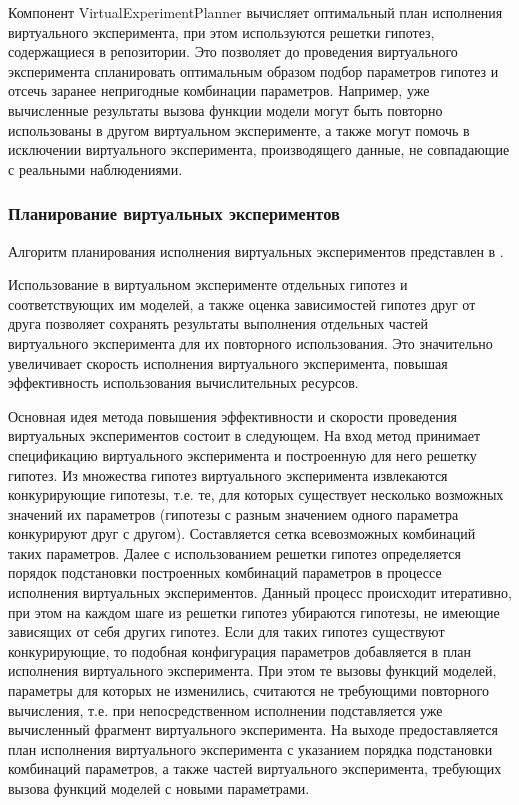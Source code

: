 Компонент VirtualExperimentPlanner вычисляет оптимальный план исполнения виртуального эксперимента, при этом 
используются решетки гипотез, содержащиеся в репозитории. Это позволяет до проведения виртуального эксперимента 
спланировать оптимальным образом подбор параметров гипотез и отсечь заранее непригодные комбинации параметров. 
Например, уже вычисленные результаты вызова функции модели могут быть повторно использованы в другом виртуальном 
эксперименте, а также могут помочь в исключении виртуального эксперимента, производящего данные, 
не совпадающие с реальными наблюдениями.

\subsubsection{Планирование виртуальных экспериментов}\label{sect_4_4}
Алгоритм планирования исполнения виртуальных экспериментов представлен в .

Использование в виртуальном эксперименте отдельных гипотез и соответствующих им моделей, а также оценка зависимостей 
гипотез друг от друга позволяет сохранять результаты выполнения отдельных частей виртуального эксперимента для их 
повторного использования. Это значительно увеличивает скорость исполнения виртуального эксперимента, повышая 
эффективность использования вычислительных ресурсов.

Основная идея метода повышения эффективности и скорости проведения виртуальных экспериментов состоит в следующем. 
На вход метод принимает спецификацию виртуального эксперимента и построенную для него решетку гипотез. Из множества 
гипотез виртуального эксперимента извлекаются конкурирующие гипотезы, т.е. те, для которых существует несколько 
возможных значений их параметров (гипотезы с разным значением одного параметра конкурируют друг с другом). 
Составляется сетка всевозможных комбинаций таких параметров. Далее с использованием решетки гипотез определяется 
порядок подстановки построенных комбинаций параметров в процессе исполнения виртуальных экспериментов. 
Данный процесс происходит итеративно, при этом на каждом шаге из решетки гипотез убираются гипотезы, не имеющие 
зависящих от себя других гипотез. Если для таких гипотез существуют конкурирующие, то подобная конфигурация 
параметров добавляется в план исполнения виртуального эксперимента. При этом те вызовы функций моделей, параметры для 
которых не изменились, считаются не требующими повторного вычисления, т.е. при непосредственном исполнении 
подставляется уже вычисленный фрагмент виртуального эксперимента. На выходе предоставляется план исполнения 
виртуального эксперимента с указанием порядка подстановки комбинаций параметров, а также частей виртуального 
эксперимента, требующих вызова функций моделей с новыми параметрами.

